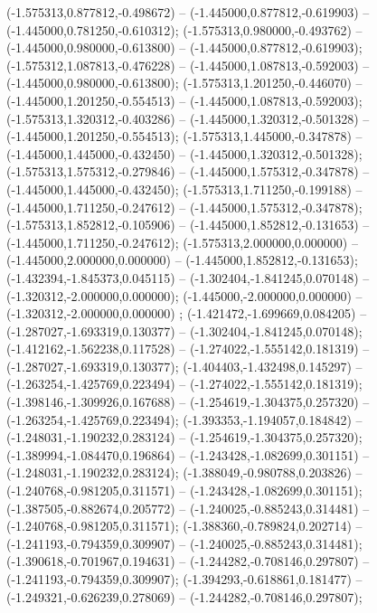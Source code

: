  (-1.575313,0.877812,-0.498672) -- (-1.445000,0.877812,-0.619903) -- (-1.445000,0.781250,-0.610312);
 (-1.575313,0.980000,-0.493762) -- (-1.445000,0.980000,-0.613800) -- (-1.445000,0.877812,-0.619903);
 (-1.575312,1.087813,-0.476228) -- (-1.445000,1.087813,-0.592003) -- (-1.445000,0.980000,-0.613800);
 (-1.575313,1.201250,-0.446070) -- (-1.445000,1.201250,-0.554513) -- (-1.445000,1.087813,-0.592003);
 (-1.575313,1.320312,-0.403286) -- (-1.445000,1.320312,-0.501328) -- (-1.445000,1.201250,-0.554513);
 (-1.575313,1.445000,-0.347878) -- (-1.445000,1.445000,-0.432450) -- (-1.445000,1.320312,-0.501328);
 (-1.575313,1.575312,-0.279846) -- (-1.445000,1.575312,-0.347878) -- (-1.445000,1.445000,-0.432450);
 (-1.575313,1.711250,-0.199188) -- (-1.445000,1.711250,-0.247612) -- (-1.445000,1.575312,-0.347878);
 (-1.575313,1.852812,-0.105906) -- (-1.445000,1.852812,-0.131653) -- (-1.445000,1.711250,-0.247612);
 (-1.575313,2.000000,0.000000) -- (-1.445000,2.000000,0.000000) -- (-1.445000,1.852812,-0.131653);
 (-1.432394,-1.845373,0.045115) -- (-1.302404,-1.841245,0.070148) -- (-1.320312,-2.000000,0.000000);
 (-1.445000,-2.000000,0.000000) -- (-1.320312,-2.000000,0.000000) ;
 (-1.421472,-1.699669,0.084205) -- (-1.287027,-1.693319,0.130377) -- (-1.302404,-1.841245,0.070148);
 (-1.412162,-1.562238,0.117528) -- (-1.274022,-1.555142,0.181319) -- (-1.287027,-1.693319,0.130377);
 (-1.404403,-1.432498,0.145297) -- (-1.263254,-1.425769,0.223494) -- (-1.274022,-1.555142,0.181319);
 (-1.398146,-1.309926,0.167688) -- (-1.254619,-1.304375,0.257320) -- (-1.263254,-1.425769,0.223494);
 (-1.393353,-1.194057,0.184842) -- (-1.248031,-1.190232,0.283124) -- (-1.254619,-1.304375,0.257320);
 (-1.389994,-1.084470,0.196864) -- (-1.243428,-1.082699,0.301151) -- (-1.248031,-1.190232,0.283124);
 (-1.388049,-0.980788,0.203826) -- (-1.240768,-0.981205,0.311571) -- (-1.243428,-1.082699,0.301151);
 (-1.387505,-0.882674,0.205772) -- (-1.240025,-0.885243,0.314481) -- (-1.240768,-0.981205,0.311571);
 (-1.388360,-0.789824,0.202714) -- (-1.241193,-0.794359,0.309907) -- (-1.240025,-0.885243,0.314481);
 (-1.390618,-0.701967,0.194631) -- (-1.244282,-0.708146,0.297807) -- (-1.241193,-0.794359,0.309907);
 (-1.394293,-0.618861,0.181477) -- (-1.249321,-0.626239,0.278069) -- (-1.244282,-0.708146,0.297807);
